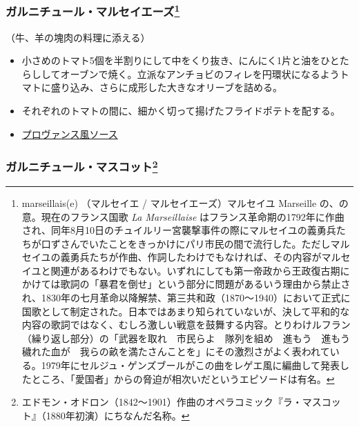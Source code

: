 \begin{recette}
\hypertarget{garniture-a-la-marseillaise}{%
\subsubsection[ガルニチュール・マルセイエーズ]{\texorpdfstring{ガルニチュール・マルセイエーズ\footnote{marseillais(e)
  （マルセイエ / マルセイエーズ）マルセイユ Marseille
  の、の意。現在のフランス国歌 \emph{La Marseillaise}
  はフランス革命期の1792年に作曲され、同年8月10日のチュイルリー宮襲撃事件の際にマルセイユの義勇兵たちが口ずさんでいたことをきっかけにパリ市民の間で流行した。ただしマルセイユの義勇兵たちが作曲、作詞したわけでもなければ、その内容がマルセイユと関連があるわけでもない。いずれにしても第一帝政から王政復古期にかけては歌詞の「暴君を倒せ」という部分に問題があるいう理由から禁止され、1830年の七月革命以降解禁、第三共和政（1870〜1940）において正式に国歌として制定された。日本ではあまり知られていないが、決して平和的な内容の歌詞ではなく、むしろ激しい戦意を鼓舞する内容。とりわけルフラン（繰り返し部分）の「武器を取れ　市民らよ　隊列を組め　進もう　進もう　穢れた血が　我らの畝を満たさんことを」にその激烈さがよく表われている。1979年にセルジュ・ゲンズブールがこの曲をレゲエ風に編曲して発表したところ、「愛国者」からの脅迫が相次いだというエピソードは有名。}}{ガルニチュール・マルセイエーズ}}\label{garniture-a-la-marseillaise}}



（牛、羊の塊肉の料理に添える）

\begin{itemize}
\item
  小さめのトマト5個を半割りにして中をくり抜き、にんにく1片と油をひとたらししてオーブンで焼く。立派なアンチョビのフィレを円環状になるようトマトに盛り込み、さらに成形した大きなオリーブを詰める。
\item
  それぞれのトマトの間に、細かく切って揚げたフライドポテトを配する。
\item
  \protect\hyperlink{sauce-provencale}{プロヴァンス風ソース}
\end{itemize}

\hypertarget{garniture-mascotte}{%
\subsubsection[ガルニチュール・マスコット]{\texorpdfstring{ガルニチュール・マスコット\footnote{エドモン・オドロン（1842〜1901）作曲のオペラコミック『ラ・マスコット』（1880年初演）にちなんだ名称。}}{ガルニチュール・マスコット}}\label{garniture-mascotte}}


\end{recette}
